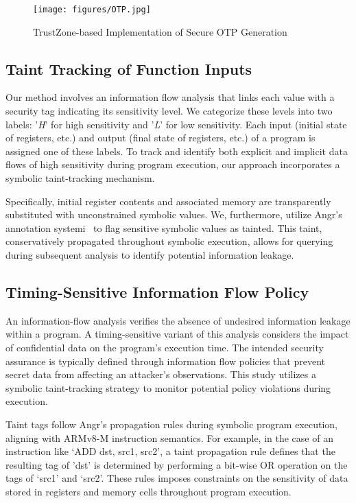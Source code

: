 \begin{figure*}
  \centering
  \texttt{[image: figures/OTP.jpg]}
  \caption{TrustZone-based Implementation of Secure OTP Generation}
  \label{fig:OTP}
\end{figure*}

\subsection{Taint Tracking of Function Inputs}

Our method involves an information flow analysis that links each value with
a security tag indicating its sensitivity level. We categorize
these levels into two labels: '\textit{H}' for high sensitivity and
'\textit{L}' for low sensitivity. Each input (initial state of registers,
etc.) and output (final state of registers, etc.) of a program is assigned
one of these labels. To track and identify both explicit and
implicit data flows of high sensitivity during program execution, our
approach incorporates a symbolic taint-tracking mechanism.

Specifically, initial register contents and associated memory are
transparently substituted with unconstrained symbolic values. We,
furthermore, utilize Angr’s annotation systemi~\cite{angr} to flag 
sensitive symbolic values as tainted. This taint, conservatively propagated
throughout symbolic execution, allows for querying during
subsequent analysis to identify potential information leakage. 

\subsection{Timing-Sensitive Information Flow Policy}

An information-flow analysis verifies the absence of undesired information
leakage within a program. A timing-sensitive variant of this analysis
considers the impact of confidential data on the program's execution time.
The intended security assurance is typically defined through information
flow policies that prevent secret data from affecting an attacker's
observations. This study utilizes a symbolic taint-tracking strategy to
monitor potential policy violations during execution.

Taint tags follow Angr's propagation rules during symbolic
program execution, aligning with ARMv8-M instruction semantics. For
example, in the case of an instruction like ‘ADD dst, src1, src2’, a taint
propagation rule defines that the resulting tag of 'dst' is
determined by performing a bit-wise OR operation on the tags of ‘src1’ and
‘src2’. These rules imposes constraints on the sensitivity of
data stored in registers and memory cells throughout program execution. 

